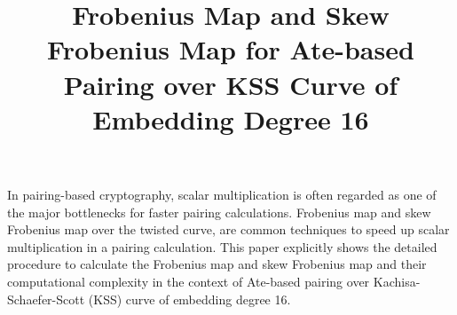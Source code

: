 





\title{Frobenius Map and Skew Frobenius Map for Ate-based Pairing over KSS Curve of Embedding Degree 16}

In pairing-based cryptography, scalar multiplication is often regarded as one of the major bottlenecks for faster pairing calculations. Frobenius map and skew Frobenius map over the twisted curve, are common techniques to speed up scalar multiplication in a pairing calculation. This paper explicitly shows the detailed procedure to calculate the Frobenius map and skew Frobenius map and their computational complexity in the context of Ate-based pairing over Kachisa-Schaefer-Scott (KSS) curve of embedding degree 16.


